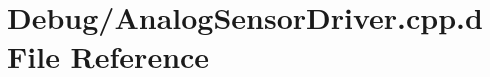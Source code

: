 \hypertarget{_debug_2_analog_sensor_driver_8cpp_8d}{\section{\-Debug/\-Analog\-Sensor\-Driver.cpp.\-d \-File \-Reference}
\label{_debug_2_analog_sensor_driver_8cpp_8d}
}
